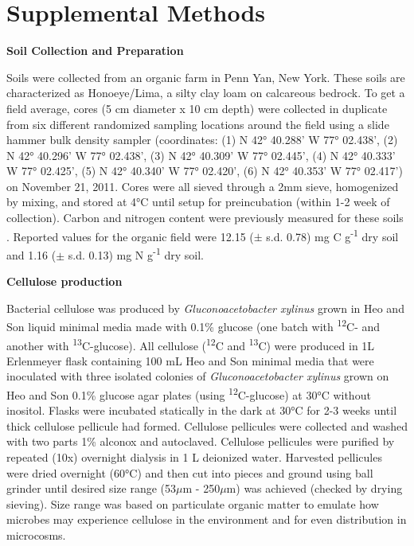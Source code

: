 \section{Supplemental Methods}


\textbf{Soil Collection and Preparation}



Soils were collected from an organic farm in Penn Yan, New York.  These soils are characterized as Honoeye/Lima, a silty clay loam on calcareous bedrock. To get a field average, cores (5 cm diameter x 10 cm depth) were collected in duplicate from six different randomized sampling locations around the field using a slide hammer bulk density sampler (coordinates: (1) N 42° 40.288’ W 77° 02.438’, (2) N 42° 40.296’ W 77° 02.438’, (3) N 42° 40.309’ W 77° 02.445’, (4) N 42° 40.333’ W 77° 02.425’, (5) N 42° 40.340’ W 77° 02.420’, (6) N 42° 40.353’ W 77° 02.417’) on November 21, 2011. Cores were all sieved through a 2mm sieve, homogenized by mixing, and stored at 4°C until setup for preincubation (within 1-2 week of collection).  Carbon and nitrogen content were previously measured for these soils \cite{Berthrong_2013}. Reported values for the organic field were 12.15 ($\pm$ s.d. 0.78) mg C g\textsuperscript{-1} dry soil and 1.16 ($\pm$ s.d. 0.13) mg N g\textsuperscript{-1} dry soil.



\textbf{Cellulose production}

Bacterial cellulose was produced by \textit{Gluconoacetobacter xylinus} grown in Heo and Son \cite{Heo_2002} liquid minimal media made with 0.1\% glucose (one batch with \textsuperscript{12}C- and another with \textsuperscript{13}C-glucose). All cellulose (\textsuperscript{12}C and \textsuperscript{13}C) were produced in 1L Erlenmeyer flask containing 100 mL Heo and Son minimal media that were inoculated with three isolated colonies of \textit{Gluconoacetobacter xylinus} grown on Heo and Son 0.1\% glucose agar plates (using \textsuperscript{12}C-glucose) at 30°C without inositol. Flasks were incubated statically in the dark at 30°C for 2-3 weeks until thick cellulose pellicule had formed.  Cellulose pellicules were collected and washed with two parts 1\% alconox and autoclaved. Cellulose pellicules were purified by repeated (10x) overnight dialysis in 1 L deionized water. Harvested pellicules were dried overnight (60°C) and then cut into pieces and ground using ball grinder until desired size range (53$\mu$m - 250$\mu$m) was achieved (checked by drying sieving). Size range was based on particulate organic matter to emulate how microbes may experience cellulose in the environment \cite{Cambardella_1992} and for even distribution in microcosms. 


